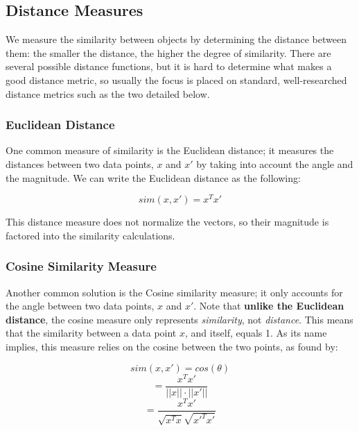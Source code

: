 \documentclass{article}
\begin{document}
\subsection{Distance Measures}

We measure the similarity between objects by determining the distance between them: the smaller the distance, the higher the degree of similarity. There are several possible distance functions, but it is hard to determine what makes a good distance metric, so usually the focus is placed on standard, well-researched distance metrics such as the two detailed below.

\subsubsection{Euclidean Distance}

One common measure of similarity is the Euclidean distance; it measures the distances between two data points, $x$ and $x'$ by taking into account the angle and the magnitude. We can write the Euclidean distance as the following:

\begin{equation}
	sim(x, x') = x^T x'
\end{equation}

This distance measure does not normalize the vectors, so their magnitude is factored into the similarity calculations.

\subsubsection{Cosine Similarity Measure}

Another common solution is the Cosine similarity measure; it only accounts for the angle between two data points, $x$ and $x'$. Note that \textbf{unlike the Euclidean distance}, the cosine measure only represents \textit{similarity}, not \textit{distance}. This means that the similarity between a data point $x$, and itself, equals 1. As its name implies, this measure relies on the cosine between the two points, as found by:

\begin{equation}
	sim(x, x') = cos(\theta)
\end{equation}
\begin{equation}
	= \frac{x^T x'}{||x|| \cdot ||x'||}
\end{equation}
\begin{equation}
	= \frac{x^T x'}{ \sqrt{x^T x} \sqrt{{x'}^T x'} }
\end{equation}
\end{document}

